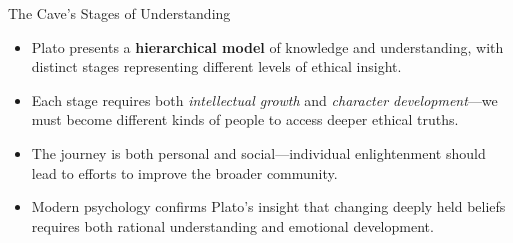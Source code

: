 \documentclass[aspectratio=169]{beamer}
\begin{document}
\begin{frame}{The Cave's Stages of Understanding}
\begin{itemize}
\item Plato presents a \textbf{hierarchical model} of knowledge and understanding, with distinct stages representing different levels of ethical insight.
\item Each stage requires both \emph{intellectual growth} and \emph{character development}—we must become different kinds of people to access deeper ethical truths.
\item The journey is both personal and social—individual enlightenment should lead to efforts to improve the broader community.
\item Modern psychology confirms Plato's insight that changing deeply held beliefs requires both rational understanding and emotional development.
\end{itemize}
\end{frame}
\end{document}
